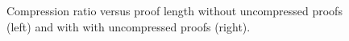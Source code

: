 


\begin{figure}
\centering
\caption{Compression ratio versus proof length without uncompressed proofs (left) and with with uncompressed proofs (right).}
\label{fig:ex1}
\end{figure}



